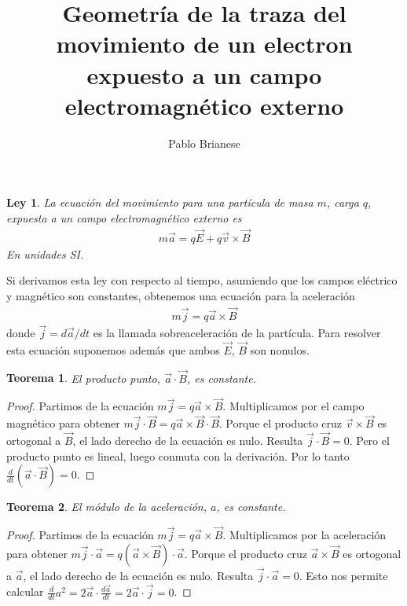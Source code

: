 \documentclass{article}
\title{Geometría de la traza del movimiento de un electron expuesto a un campo electromagnético externo}
\author{Pablo Brianese}
\newtheorem{physicalLaw}{Ley}
\newtheorem{theorem}{Teorema}
\begin{document}
  \maketitle
  \begin{physicalLaw}
    La ecuación del movimiento para una partícula de masa \(m\), carga \(q\), expuesta a un campo electromagnético externo es
    \begin{align}
      \label{equation:movementOfChargedParticleExposedToElectromagneticField}
      m \vec{a}
      =
      q \vec{E} + q \vec{v} \times \vec{B}
    \end{align}
    En unidades SI.
  \end{physicalLaw}

  Si derivamos esta ley con respecto al tiempo, asumiendo que los campos eléctrico y magnético son constantes, obtenemos una ecuación para la aceleración
  \begin{align}
    \label{equation:accelerationOfChargedParticleExposedToElectromagneticField}
    m \vec{j} = q \vec{a} \times \vec{B}
  \end{align}
  donde \(\vec{j} = d \vec{a} / d t\) es la llamada sobreaceleración de la partícula.
  Para resolver esta ecuación suponemos además que ambos \(\vec{E}\), \(\vec{B}\) son nonulos.

  \begin{theorem}
    \label{theorem:acceleration_dot_magneticFieldIsConstant}
    El producto punto, \(\vec{a} \cdot \vec{B}\), es constante.
  \end{theorem}
  \begin{proof}
    Partimos de la ecuación \(m \vec{j} = q \vec{a} \times \vec{B}\).
    Multiplicamos por el campo magnético para obtener \(m \vec{j} \cdot \vec{B} = q \vec{a} \times \vec{B} \cdot \vec{B}\).
    Porque el producto cruz \(\vec{v} \times \vec{B}\) es ortogonal a \(\vec{B}\), el lado derecho de la ecuación es nulo.
    Resulta \(\vec{j} \cdot \vec{B} = 0\).
    Pero el producto punto es lineal, luego conmuta con la derivación.
    Por lo tanto \(\frac{d}{d t} (\vec{a} \cdot \vec{B}) = 0\).
  \end{proof}

  \begin{theorem}
    \label{theorem:modulusOfAccelerationIsConstant}
    El módulo de la aceleración, \(a\), es constante.
  \end{theorem}
  \begin{proof}
    Partimos de la ecuación \(m \vec{j} = q \vec{a} \times \vec{B}\).
    Multiplicamos por la aceleración para obtener \(m \vec{j} \cdot \vec{a} = q (\vec{a} \times \vec{B}) \cdot \vec{a}\).
    Porque el producto cruz \(\vec{a} \times \vec{B}\) es ortogonal a \(\vec{a}\), el lado derecho de la ecuación es nulo.
    Resulta \(\vec{j} \cdot \vec{a} = 0\).
    Esto nos permite calcular \(\frac{d}{d t} a^2 = 2 \vec{a} \cdot \frac{d \vec{a}}{d t} = 2 \vec{a} \cdot \vec{j} = 0\).
  \end{proof}
\end{document}
